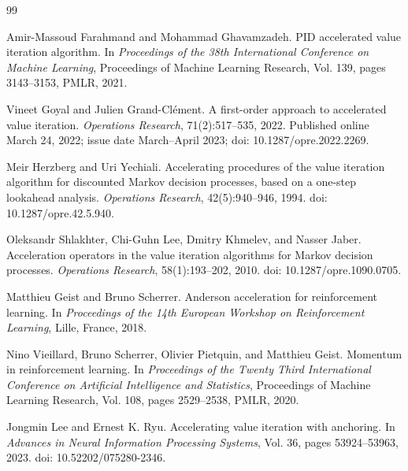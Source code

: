 \documentclass[letterpaper]{article}
\numberwithin{equation}{section}
\begin{document}
\begin{thebibliography}{99}

Amir-Massoud Farahmand and Mohammad Ghavamzadeh.
\newblock PID accelerated value iteration algorithm.
\newblock In \emph{Proceedings of the 38th International Conference on Machine Learning},
Proceedings of Machine Learning Research, Vol. 139, pages 3143--3153, PMLR, 2021.

Vineet Goyal and Julien Grand-Cl\'ement.
\newblock A first-order approach to accelerated value iteration.
\newblock \emph{Operations Research}, 71(2):517--535, 2022.
\newblock Published online March 24, 2022; issue date March--April 2023; doi: 10.1287/opre.2022.2269.

Meir Herzberg and Uri Yechiali.
\newblock Accelerating procedures of the value iteration algorithm for discounted Markov decision processes, based on a one-step lookahead analysis.
\newblock \emph{Operations Research}, 42(5):940--946, 1994.
\newblock doi: 10.1287/opre.42.5.940.

Oleksandr Shlakhter, Chi-Guhn Lee, Dmitry Khmelev, and Nasser Jaber.
\newblock Acceleration operators in the value iteration algorithms for Markov decision processes.
\newblock \emph{Operations Research}, 58(1):193--202, 2010.
\newblock doi: 10.1287/opre.1090.0705.

Matthieu Geist and Bruno Scherrer.
\newblock Anderson acceleration for reinforcement learning.
\newblock In \emph{Proceedings of the 14th European Workshop on Reinforcement Learning}, Lille, France, 2018.

Nino Vieillard, Bruno Scherrer, Olivier Pietquin, and Matthieu Geist.
\newblock Momentum in reinforcement learning.
\newblock In \emph{Proceedings of the Twenty Third International Conference on Artificial Intelligence and Statistics}, Proceedings of Machine Learning Research, Vol. 108, pages 2529--2538, PMLR, 2020.

Jongmin Lee and Ernest K. Ryu.
\newblock Accelerating value iteration with anchoring.
\newblock In \emph{Advances in Neural Information Processing Systems}, Vol. 36, pages 53924--53963, 2023.
\newblock doi: 10.52202/075280-2346.


\end{thebibliography}
\end{document}
